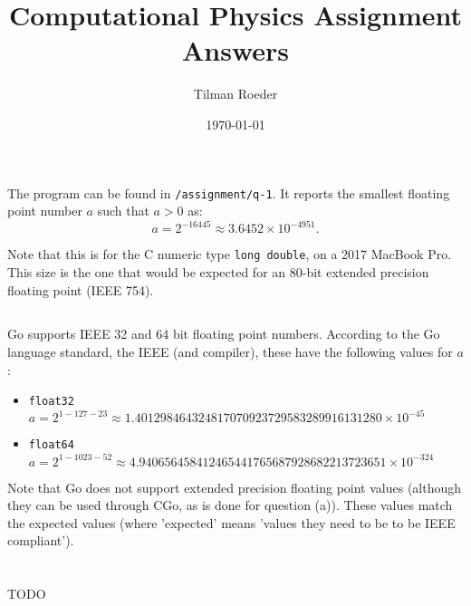 \documentclass[12pt, a4paper]{article}
\title{Computational Physics Assignment Answers}
\author{Tilman Roeder}
\date{\today}
\begin{document}
\maketitle

\section{}
  \subsection{}
  The program can be found in \texttt{/assignment/q-1}. It reports the smallest floating point number
  $a$ such that $a > 0$ as:
  \begin{equation}
    a = 2^{-16445} \approx 3.6452 \times 10^{-4951}.
  \end{equation}

  Note that this is for the C numeric type \texttt{long double}, on a 2017 MacBook Pro. This size
  is the one that would be expected for an 80-bit extended precision floating point (IEEE 754).

  \subsection{}
  Go supports IEEE 32 and 64 bit floating point numbers. According to the Go language standard, the IEEE
  (and compiler), these have the following values for $a$:
  \begin{itemize}
    \item \texttt{float32} $a = 2^{1-127-23} \approx 1.401298464324817070923729583289916131280 \times 10^{-45}$
    \item \texttt{float64} $a = 2^{1-1023-52} \approx 4.940656458412465441765687928682213723651 \times 10^{-324}$
  \end{itemize}

  Note that Go does not support extended precision floating point values (although they can be used through
  CGo, as is done for question (a)). These values match the expected values (where 'expected' means 'values
  they need to be to be IEEE compliant').

\section{}
  TODO
\end{document}
